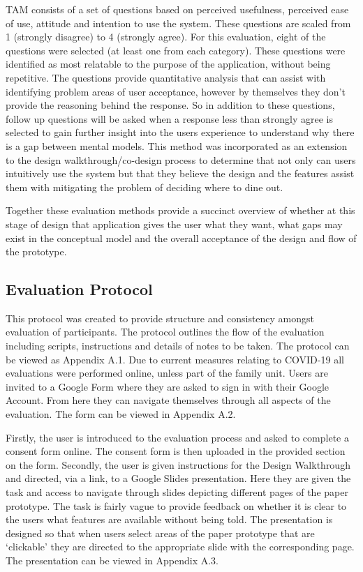 \documentclass[a4 paper, 12pt]{article}
\begin{document}
TAM consists of a set of questions based on perceived usefulness, perceived ease of use, attitude and intention to use the system. These questions are scaled from 1 (strongly disagree) to 4 (strongly agree). For this evaluation, eight of the questions were selected (at least one from each category). These questions were identified as most relatable to the purpose of the application, without being repetitive. The questions provide quantitative analysis that can assist with identifying problem areas of user acceptance, however by themselves they don't provide the reasoning behind the response. So in addition to these questions, follow up questions will be asked when a response less than strongly agree is selected to gain further insight into the users experience to understand why there is a gap between mental models. This method was incorporated as an extension to the design walkthrough/co-design process to determine that not only can users intuitively use the system but that they believe the design and the features assist them with mitigating the problem of deciding where to dine out.

Together these evaluation methods provide a succinct overview of whether at this stage of design that application gives the user what they want, what gaps may exist in the conceptual model and the overall acceptance of the design and flow of the prototype.


\subsection{Evaluation Protocol}
This protocol was created to provide structure and consistency amongst evaluation of participants. The protocol outlines the flow of the evaluation including scripts, instructions and details of notes to be taken. The protocol can be viewed as Appendix A.1. Due to current measures relating to COVID-19 all evaluations were performed online, unless part of the family unit. Users are invited to a Google Form where they are asked to sign in with their Google Account. From here they can navigate themselves through all aspects of the evaluation. The form can be viewed in Appendix A.2.  

Firstly, the user is introduced to the evaluation process and asked to complete a consent form online. The consent form is then uploaded in the provided section on the form. Secondly, the user is given instructions for the Design Walkthrough and directed, via a link, to a Google Slides presentation. Here they are given the task and access to navigate through slides depicting different pages of the paper prototype. The task is fairly vague to provide feedback on whether it is clear to the users what features are available without being told. The presentation is designed so that when users select areas of the paper prototype that are ‘clickable’ they are directed to the appropriate slide with the corresponding page. The presentation can be viewed in Appendix A.3.
\end{document}
